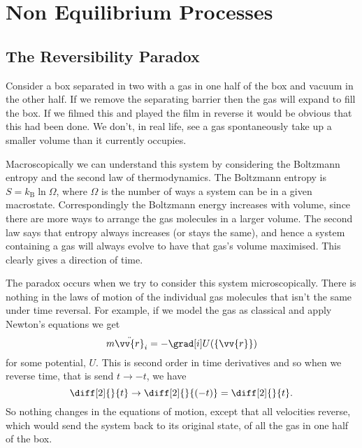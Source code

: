 \documentclass[fleqn]{NotesClass}
\newcommand*{\boltzmann}{k_{\mathrm{B}}}
\begin{document}
    \chapter{Non Equilibrium Processes}
    \section{The Reversibility Paradox}
    Consider a box separated in two with a gas in one half of the box and vacuum in the other half.
    If we remove the separating barrier then the gas will expand to fill the box.
    If we filmed this and played the film in reverse it would be obvious that this had been done.
    We don't, in real life, see a gas spontaneously take up a smaller volume than it currently occupies.
    
    Macroscopically we can understand this system by considering the Boltzmann entropy and the second law of thermodynamics.
    The Boltzmann entropy is \(S = \boltzmann\ln\Omega\), where \(\Omega\) is the number of ways a system can be in a given macrostate.
    Correspondingly the Boltzmann energy increases with volume, since there are more ways to arrange the gas molecules in a larger volume.
    The second law says that entropy always increases (or stays the same), and hence a system containing a gas will always evolve to have that gas's volume maximised.
    This clearly gives a direction of time.
    
    The paradox occurs when we try to consider this system microscopically.
    There is nothing in the laws of motion of the individual gas molecules that isn't the same under time reversal.
    For example, if we model the gas as classical and apply Newton's equations we get
    \begin{equation}
        m\ddot{\vv{r}}_i = -\grad[i]U(\{\vv{r}\})
    \end{equation}
    for some potential, \(U\).
    This is second order in time derivatives and so when we reverse time, that is send \(t \to -t\), we have
    \begin{equation}
        \diff[2]{}{t} \to \diff[2]{}{(-t)} = \diff[2]{}{t}.
    \end{equation}
    So nothing changes in the equations of motion, except that all velocities reverse, which would send the system back to its original state, of all the gas in one half of the box.
    
\end{document}
